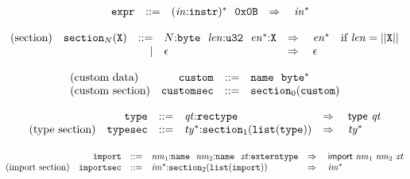 \vspace{1ex}

$$
\begin{array}[t]{@{}lrrl@{}l@{}l@{}l@{}}
& {\mathtt{expr}} & ::= & {({\mathit{in}}{:}{\mathtt{instr}})^\ast}~~\mathtt{0x0B} & \quad\Rightarrow\quad{} & {{\mathit{in}}^\ast} \\
\end{array}
$$

\vspace{1ex}

$$
\begin{array}[t]{@{}lrrl@{}l@{}l@{}l@{}}
\mbox{(section)} & {{\mathtt{section}}}_{N}({\mathtt{X}}) & ::= & N{:}{\mathtt{byte}}~~{\mathit{len}}{:}{\mathtt{u32}}~~{{\mathit{en}}^\ast}{:}{\mathtt{X}} & \quad\Rightarrow\quad{} & {{\mathit{en}}^\ast} & \quad \mbox{if}~ {\mathit{len}} = ||{\mathtt{X}}|| \\
& & | & \epsilon & \quad\Rightarrow\quad{} & \epsilon \\
\end{array}
$$

\vspace{1ex}

$$
\begin{array}[t]{@{}lrrl@{}l@{}l@{}l@{}}
\mbox{(custom data)} & {\mathtt{custom}} & ::= & {\mathtt{name}}~~{{\mathtt{byte}}^\ast} \\
\mbox{(custom section)} & {\mathtt{customsec}} & ::= & {{\mathtt{section}}}_{0}({\mathtt{custom}}) \\
\end{array}
$$

\vspace{1ex}

$$
\begin{array}[t]{@{}lrrl@{}l@{}l@{}l@{}}
& {\mathtt{type}} & ::= & {\mathit{qt}}{:}{\mathtt{rectype}} & \quad\Rightarrow\quad{} & \mathsf{type}~{\mathit{qt}} \\
\mbox{(type section)} & {\mathtt{typesec}} & ::= & {{\mathit{ty}}^\ast}{:}{{\mathtt{section}}}_{1}({\mathtt{list}}({\mathtt{type}})) & \quad\Rightarrow\quad{} & {{\mathit{ty}}^\ast} \\
\end{array}
$$

\vspace{1ex}

$$
\begin{array}[t]{@{}lrrl@{}l@{}l@{}l@{}}
& {\mathtt{import}} & ::= & {\mathit{nm}}_1{:}{\mathtt{name}}~~{\mathit{nm}}_2{:}{\mathtt{name}}~~{\mathit{xt}}{:}{\mathtt{externtype}} & \quad\Rightarrow\quad{} & \mathsf{import}~{\mathit{nm}}_1~{\mathit{nm}}_2~{\mathit{xt}} \\
\mbox{(import section)} & {\mathtt{importsec}} & ::= & {{\mathit{im}}^\ast}{:}{{\mathtt{section}}}_{2}({\mathtt{list}}({\mathtt{import}})) & \quad\Rightarrow\quad{} & {{\mathit{im}}^\ast} \\
\end{array}
$$

